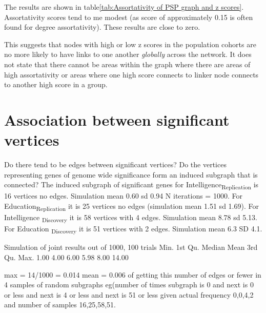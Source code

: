 The results are shown in table\ref{tab:Assortativity of PSP graph and z scores}. Assortativity scores tend to me modest (as score of approximately 0.15 is often found for degree assortativity). These results are close to zero. 

This suggests that nodes with high or low z scores in the population cohorts are no more likely to have links to one another \textit{globally} across the network. It does not state that there cannot be areas within the graph where there are areas of high assortativity or areas where one high score connects to linker node connects to another high score in a group.

\section{Association between significant vertices}
Do there tend to be edges between significant vertices? Do the vertices representing genes of genome wide significance form an induced subgraph that is connected?
The induced subgraph of significant genes for Intelligence\textsubscript{Replication} is 16 vertices no edges. Simulation mean 0.60 sd 0.94 N iterations = 1000. For Education\textsubscript{Replication} it is 25 vertices no edges (simulation mean 1.51 sd 1.69). For Intelligence \textsubscript{Discovery} it is 58 vertices with 4 edges. Simulation mean 8.78 sd 5.13. For Education \textsubscript{Discovery} it is 51 vertices with 2 edges. Simulation mean 6.3 SD 4.1.

Simulation of joint results out of 1000, 100 trials
Min. 1st Qu.  Median    Mean 3rd Qu.    Max. 
   1.00    4.00    6.00    5.98    8.00   14.00 
   
   max = 14/1000 = 0.014
   mean = 0.006 of getting this number of edges or fewer in 4 samples of random subgraphs eg(number of times subgraph is 0 and next is 0 or less and next is 4 or less and next is 51 or less given actual frequency 0,0,4,2 and number of samples 16,25,58,51.
   
 


 
 


